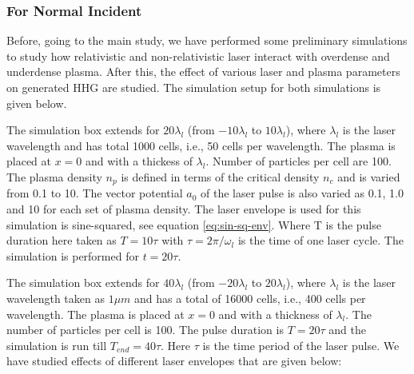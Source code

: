 \subsubsection{For Normal Incident}
Before, going to the main study, we have performed some preliminary simulations to study how relativistic and non-relativistic laser interact with overdense and underdense plasma. After this, the effect of various laser and plasma parameters on generated HHG are studied. The simulation setup for both simulations is given below.

\label{sec:preliminary}
The simulation box extends for $20 \lambda _l$ (from $-10 \lambda _l$ to $10 \lambda _l$), where $\lambda_l$ is the laser wavelength and has total 1000 cells, i.e., 50 cells per wavelength. The plasma is placed at $x=0$ and with a thickess of $\lambda_l$. Number of particles per cell are 100.  The plasma density $n_p$ is defined in terms of the critical density $n_c$ and is varied from 0.1 to 10. The vector potential $a_0$ of the laser pulse is also varied as 0.1, 1.0 and 10 for each set of plasma density. The laser envelope is used for this simulation is sine-squared, see equation \ref{eq:sin-sq-env}. Where T is the pulse duration here taken as $T=10\tau$ with $\tau = 2\pi/\omega_l$ is the time of one laser cycle. The simulation is performed for $t=20\tau$.

\label{sec:normal_hhg}
The simulation box extends for $40 \lambda _l$ (from $-20 \lambda _l$ to $20 \lambda _l$), where $\lambda_l$ is the laser wavelength taken as $1\mu m$ and has a total of 16000 cells, i.e., 400 cells per wavelength. The plasma is placed at $x=0$ and with a thickness of $\lambda_l$. The number of particles per cell is 100. The pulse duration is $T = 20 \tau$ and the simulation is run till $T_{end} = 40 \tau$. Here $\tau$ is the time period of the laser pulse. We have studied effects of different laser envelopes that are given below:

